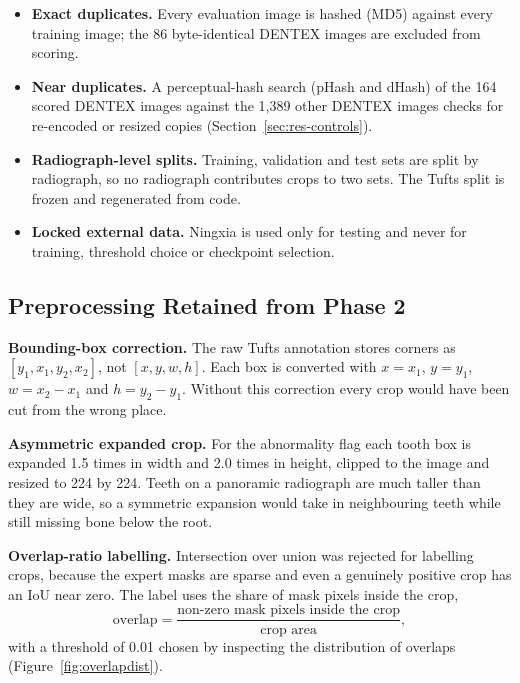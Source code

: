 \begin{itemize}
\item \textbf{Exact duplicates.} Every evaluation image is hashed (MD5) against every training image;
  the 86 byte-identical DENTEX images are excluded from scoring.
\item \textbf{Near duplicates.} A perceptual-hash search (pHash and dHash) of the 164 scored DENTEX
  images against the 1,389 other DENTEX images checks for re-encoded or resized copies
  (Section~\ref{sec:res-controls}).
\item \textbf{Radiograph-level splits.} Training, validation and test sets are split by radiograph, so
  no radiograph contributes crops to two sets. The Tufts split is frozen and regenerated from code.
\item \textbf{Locked external data.} Ningxia is used only for testing and never for training,
  threshold choice or checkpoint selection.
\end{itemize}

\subsection{Preprocessing Retained from Phase 2}

\textbf{Bounding-box correction.} The raw Tufts annotation stores corners as $[y_1, x_1, y_2, x_2]$,
not $[x, y, w, h]$. Each box is converted with $x = x_1$, $y = y_1$, $w = x_2 - x_1$ and $h = y_2 - y_1$.
Without this correction every crop would have been cut from the wrong place.

\textbf{Asymmetric expanded crop.} For the abnormality flag each tooth box is expanded 1.5 times in
width and 2.0 times in height, clipped to the image and resized to 224 by 224. Teeth on a panoramic
radiograph are much taller than they are wide, so a symmetric expansion would take in neighbouring
teeth while still missing bone below the root.

\textbf{Overlap-ratio labelling.} Intersection over union was rejected for labelling crops, because the
expert masks are sparse and even a genuinely positive crop has an IoU near zero. The label uses the
share of mask pixels inside the crop,
\begin{equation}
\text{overlap} = \frac{\text{non-zero mask pixels inside the crop}}{\text{crop area}},
\label{eq:overlap}
\end{equation}
with a threshold of 0.01 chosen by inspecting the distribution of overlaps
(Figure~\ref{fig:overlapdist}).

